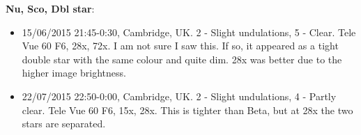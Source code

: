 {\bf Nu, Sco, Dbl star}:
\begin{itemize}
\item 15/06/2015 21:45-0:30, Cambridge, UK. 2 - Slight undulations, 5 - Clear. Tele Vue 60 F6, 28x, 72x. I am not sure I saw this. If so, it appeared as a tight double star with the same colour and quite dim. 28x was better due to the higher image brightness.
\item 22/07/2015 22:50-0:00, Cambridge, UK. 2 - Slight undulations, 4 - Partly clear. Tele Vue 60 F6, 15x, 28x. This is tighter than Beta, but at 28x the two stars are separated.
\end{itemize}

